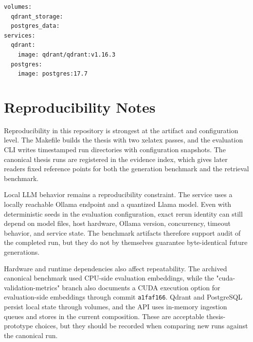 \begin{lstlisting}[language={},caption={Persistence-bearing local dependencies.}]
volumes:
  qdrant_storage:
  postgres_data:
services:
  qdrant:
    image: qdrant/qdrant:v1.16.3
  postgres:
    image: postgres:17.7
\end{lstlisting}

\section{Reproducibility Notes}

Reproducibility in this repository is strongest at the artifact and configuration level. The Makefile builds the thesis with two xelatex passes, and the evaluation CLI writes timestamped run directories with configuration snapshots. The canonical thesis runs are registered in the evidence index, which gives later readers fixed reference points for both the generation benchmark and the retrieval benchmark.

Local LLM behavior remains a reproducibility constraint. The service uses a locally reachable Ollama endpoint and a quantized Llama model. Even with deterministic seeds in the evaluation configuration, exact rerun identity can still depend on model files, host hardware, Ollama version, concurrency, timeout behavior, and service state. The benchmark artifacts therefore support audit of the completed run, but they do not by themselves guarantee byte-identical future generations.

Hardware and runtime dependencies also affect repeatability. The archived canonical benchmark used CPU-side evaluation embeddings, while the "cuda-validation-metrics" branch also documents a CUDA execution option for evaluation-side embeddings through commit \texttt{a1faf166}. Qdrant and PostgreSQL persist local state through volumes, and the API uses in-memory ingestion queues and stores in the current composition. These are acceptable thesis-prototype choices, but they should be recorded when comparing new runs against the canonical run.

